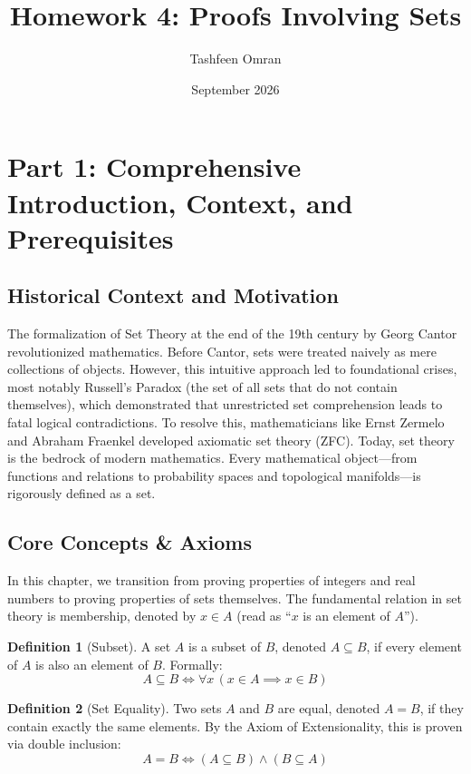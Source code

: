 \documentclass[11pt]{article}
\title{Homework 4: Proofs Involving Sets}
\author{Tashfeen Omran}
\date{September 2026}
\theoremstyle{definition}
\newtheorem{definition}{Definition}[section]
\theoremstyle{remark}
\begin{document}
\maketitle
\tableofcontents
\newpage

\section{Part 1: Comprehensive Introduction, Context, and Prerequisites}

\subsection{Historical Context and Motivation}
The formalization of Set Theory at the end of the 19th century by Georg Cantor revolutionized mathematics. Before Cantor, sets were treated naively as mere collections of objects. However, this intuitive approach led to foundational crises, most notably Russell's Paradox (the set of all sets that do not contain themselves), which demonstrated that unrestricted set comprehension leads to fatal logical contradictions. To resolve this, mathematicians like Ernst Zermelo and Abraham Fraenkel developed axiomatic set theory (ZFC). Today, set theory is the bedrock of modern mathematics. Every mathematical object—from functions and relations to probability spaces and topological manifolds—is rigorously defined as a set. 

\subsection{Core Concepts \& Axioms}
In this chapter, we transition from proving properties of integers and real numbers to proving properties of sets themselves. The fundamental relation in set theory is membership, denoted by $x \in A$ (read as ``$x$ is an element of $A$''). 

\begin{definition}[Subset]
A set $A$ is a subset of $B$, denoted $A \subseteq B$, if every element of $A$ is also an element of $B$. Formally:
\[ A \subseteq B \iff \forall x \, (x \in A \implies x \in B) \]
\end{definition}

\begin{definition}[Set Equality]
Two sets $A$ and $B$ are equal, denoted $A = B$, if they contain exactly the same elements. By the Axiom of Extensionality, this is proven via double inclusion:
\[ A = B \iff (A \subseteq B) \land (B \subseteq A) \]
\end{definition}
\end{document}
